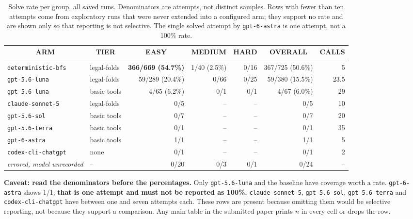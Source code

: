 \begin{table}[h]
\caption{Solve rate per group, all saved runs. Denominators are attempts, not distinct samples.
Rows with fewer than ten attempts come from exploratory runs that were never extended into a
configured arm; they support no rate and are shown only so that reporting is not selective. The
single solved attempt by \texttt{gpt-6-astra} is one attempt, not a 100\% rate.}
\label{tab:headline}
\begin{center}
\footnotesize
\setlength{\tabcolsep}{2.5pt}
\begin{tabular}{llrrrrr}
\multicolumn{1}{c}{\bf ARM} &\multicolumn{1}{c}{\bf TIER} &\multicolumn{1}{c}{\bf EASY} &\multicolumn{1}{c}{\bf MEDIUM} &\multicolumn{1}{c}{\bf HARD} &\multicolumn{1}{c}{\bf OVERALL} &\multicolumn{1}{c}{\bf CALLS} \\
\hline \\
\texttt{deterministic-bfs} & legal-folds & {\bf 366/669 (54.7\%)} & 1/40 (2.5\%) & 0/16 & 367/725 (50.6\%) & 5 \\
\texttt{gpt-5.6-luna}      & legal-folds & 59/289 (20.4\%) & 0/66 & 0/25 & 59/380 (15.5\%) & 23.5 \\
\texttt{gpt-5.6-luna}      & basic tools & 4/65 (6.2\%)    & 0/1  & 0/1  & 4/67 (6.0\%)    & 29 \\
\texttt{claude-sonnet-5}   & legal-folds & 0/5  & -- & -- & 0/5 & 10 \\
\texttt{gpt-5.6-sol}       & basic tools & 0/7  & -- & -- & 0/7 & 20 \\
\texttt{gpt-5.6-terra}     & basic tools & 0/1  & -- & -- & 0/1 & 35 \\
\texttt{gpt-6-astra}       & basic tools & 1/1  & -- & -- & 1/1 & 5 \\
\texttt{codex-cli-chatgpt} & none        & 0/1  & -- & -- & 0/1 & 2 \\
\emph{errored, model unrecorded} & -- & 0/20 & 0/3 & 0/1 & 0/24 & -- \\
\end{tabular}
\end{center}
\end{table}

\textbf{Caveat: read the denominators before the percentages.} Only \texttt{gpt-5.6-luna} and the
baseline have coverage worth a rate. \texttt{gpt-6-astra} shows 1/1; \textbf{that is one attempt and
must not be reported as 100\%.} \texttt{claude-sonnet-5}, \texttt{gpt-5.6-sol},
\texttt{gpt-5.6-terra} and \texttt{codex-cli-chatgpt} have between one and seven attempts each.
These rows are present because omitting them would be selective reporting, not because they support
a comparison. Any main table in the submitted paper prints $n$ in every cell or drops the row.

